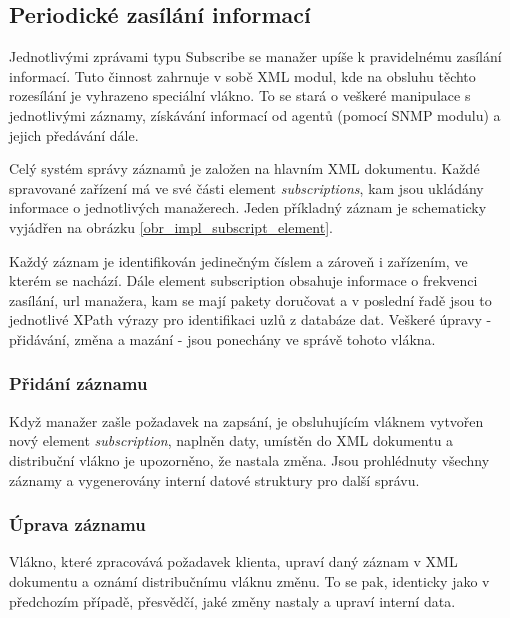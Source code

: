 \subsection{Periodické zasílání informací}
Jednotlivými zprávami typu Subscribe se manažer upíše k pravidelnému zasílání informací. Tuto činnost zahrnuje v sobě XML modul, kde na obsluhu těchto
rozesílání je vyhrazeno speciální vlákno. To se stará o veškeré manipulace s jednotlivými záznamy, získávání informací od agentů (pomocí SNMP modulu) a jejich
předávání dále.

Celý systém správy záznamů je založen na hlavním XML dokumentu. Každé spravované zařízení má ve své části element \textit{subscriptions}, kam jsou ukládány
informace o jednotlivých manažerech. Jeden příkladný záznam je schematicky vyjádřen na obrázku \ref{obr_impl_subscript_element}.

Každý záznam je identifikován jedinečným číslem a zároveň i zařízením, ve kterém se nachází. Dále element subscription obsahuje informace o frekvenci zasílání, 
url manažera, kam se mají pakety doručovat a v poslední řadě jsou to jednotlivé XPath výrazy pro identifikaci uzlů z databáze dat.
Veškeré úpravy - přidávání, změna a mazání - jsou ponechány ve správě tohoto vlákna.

\subsubsection*{Přidání záznamu}
Když manažer zašle požadavek na zapsání, je obsluhujícím vláknem vytvořen nový element \textit{subscription}, naplněn daty, umístěn do XML dokumentu a 
distribuční vlákno je upozorněno, že nastala změna. Jsou prohlédnuty všechny záznamy a vygenerovány interní datové struktury pro další správu.

\subsubsection*{Úprava záznamu}
Vlákno, které zpracovává požadavek klienta, upraví daný záznam v XML dokumentu a oznámí distribučnímu vláknu změnu. To se pak, identicky jako v předchozím případě,
přesvědčí, jaké změny nastaly a upraví interní data.

